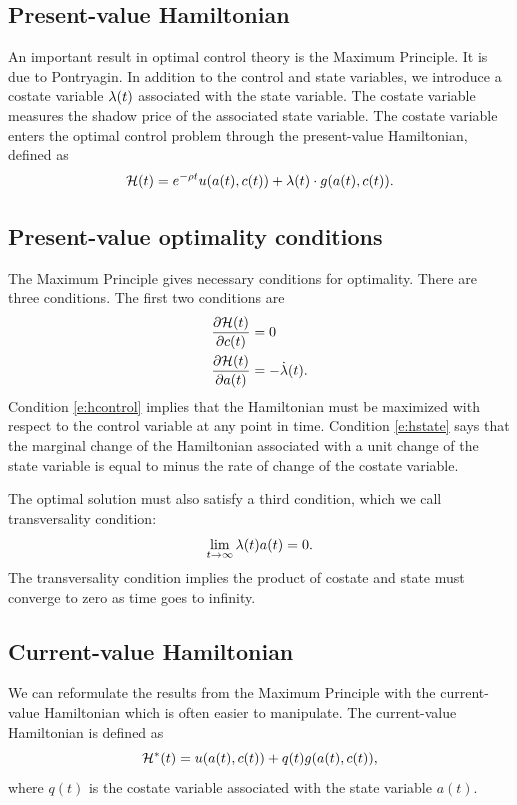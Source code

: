 \documentclass[letterpaper, 11pt, leqno]{article}
\begin{document}
\subsection{Present-value Hamiltonian}

An important result in optimal control theory is the Maximum Principle. It is due to Pontryagin. In addition to the control and state variables, we introduce a costate variable $\lambda(t)$ associated with the state variable. The costate variable measures the shadow price of the associated state variable. The costate variable enters the optimal control problem through the present-value Hamiltonian, defined as 
\begin{equation}
\mathcal{H}(t)=e^{-\rho t} u(a(t),c(t)) +\lambda(t)\cdot g(a(t),c(t)). 
\label{e:HAMILDEF}\end{equation}

\subsection{Present-value optimality conditions}

The Maximum Principle gives necessary conditions for optimality. There are three conditions. The first two conditions are
\begin{align}
\pd{\Hc(t)}{c(t)} &=0 \label{e:hcontrol} \\
\pd{\Hc(t)}{a(t)} &=-\dot{\l}(t).\label{e:hstate}
\end{align}
Condition \eqref{e:hcontrol} implies that the Hamiltonian must be maximized
with respect to the control variable at any point in time. Condition \eqref{e:hstate} says that the marginal change of the Hamiltonian associated with a unit change of the state variable is equal to minus the rate of change of the costate variable. 

The optimal solution must also satisfy a third condition, which we call transversality condition:
\begin{equation}
\lim_{t\to \infty}\lambda(t) a(t)=0.
\label{e:tvc}\end{equation}
The transversality condition implies the product of costate and state must converge to zero as time goes to infinity.

\subsection{Current-value Hamiltonian}

We can reformulate the results from the Maximum Principle with the current-value Hamiltonian which is often easier to manipulate. The current-value Hamiltonian is defined as 
\begin{equation*}
\mathcal{H}^{*}(t)= u(a(t),c(t)) +q(t) g(a(t),c(t)),
\end{equation*}
where $q(t)$ is the costate variable associated with the state variable $a(t)$.
\end{document}
